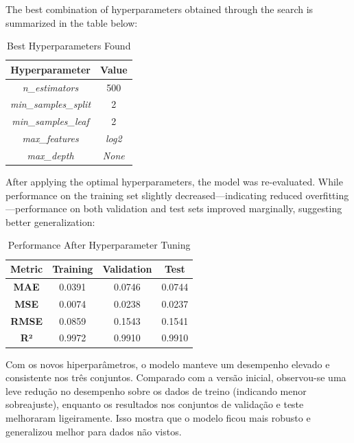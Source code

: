 The best combination of hyperparameters obtained through the search is summarized in the table below:

\begin{table}[H]
\centering
\caption{Best Hyperparameters Found}
\begin{tabular}{|c|c|}
\hline
\textbf{Hyperparameter} & \textbf{Value} \\
\hline
\textit{n\_estimators} & 500 \\
\hline
\textit{min\_samples\_split} & 2 \\
\hline
\textit{min\_samples\_leaf} & 2 \\
\hline
\textit{max\_features} & \textit{log2} \\
\hline
\textit{max\_depth} & \textit{None} \\
\hline
\end{tabular}
\label{tab:rf_best_hyperparameters}
\end{table}

After applying the optimal hyperparameters, the model was re-evaluated. While performance on the training set slightly decreased—indicating reduced overfitting—performance on both validation and test sets improved marginally, suggesting better generalization:

\begin{table}[H]
\centering
\caption{Performance After Hyperparameter Tuning}
\begin{tabular}{||c|c|c|c||}
\hline
\textbf{Metric} & \textbf{Training} & \textbf{Validation} & \textbf{Test} \\
\hline
\textbf{MAE} & 0.0391 & 0.0746 & 0.0744 \\
\hline
\textbf{MSE} & 0.0074 & 0.0238 & 0.0237 \\
\hline
\textbf{RMSE} & 0.0859 & 0.1543 & 0.1541 \\
\hline
\textbf{R²} & 0.9972 & 0.9910 & 0.9910 \\
\hline
\end{tabular}
\label{tab:rf_optimized_performance}
\end{table}

Com os novos hiperparâmetros, o modelo manteve um desempenho elevado e consistente nos três conjuntos. Comparado com a versão inicial, observou-se uma leve redução no desempenho sobre os dados de treino (indicando menor sobreajuste), enquanto os resultados nos conjuntos de validação e teste melhoraram ligeiramente. Isso mostra que o modelo ficou mais robusto e generalizou melhor para dados não vistos.



